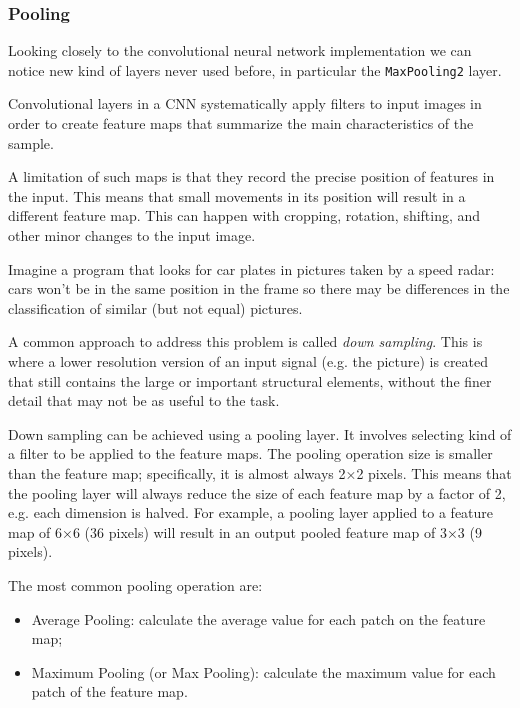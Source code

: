 \begin{attention}
\subsubsection{Pooling}

Looking closely to the convolutional neural network implementation we can notice new kind of layers never used before, in particular the \texttt{MaxPooling2} layer.

Convolutional layers in a CNN systematically apply filters to input images in order to create feature maps that summarize the main characteristics of the sample.

A limitation of such maps is that they record the precise position of features in the input. This means that small movements in its position will result in a different feature map. This can happen with cropping, rotation, shifting, and other minor changes to the input image.

Imagine a program that looks for car plates in pictures taken by a speed radar: cars won't be in the same position in the frame so there may be differences in the classification of similar (but not equal) pictures.

A common approach to address this problem is called \emph{down sampling}. 
This is where a lower resolution version of an input signal (e.g. the picture) is created that still contains the large or important structural elements, without the finer detail that may not be as useful to the task.

Down sampling can be achieved using a pooling layer.
It involves selecting kind of a filter to be applied to the feature maps. The pooling operation size is smaller than the feature map; specifically, it is almost always 2×2 pixels. This means that the pooling layer will always reduce the size of each feature map by a factor of 2, e.g. each dimension is halved. For example, a pooling layer applied to a feature map of 6×6 (36 pixels) will result in an output pooled feature map of 3×3 (9 pixels).

The most common pooling operation are:
\begin{itemize}
\tightlist
\item Average Pooling: calculate the average value for each patch on the feature map;
\item Maximum Pooling (or Max Pooling): calculate the maximum value for each patch of the feature map.
\end{itemize}
\end{attention}

